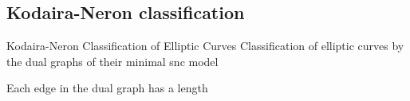 \subsection{Kodaira-Neron classification} \label{sec:kodaira-neron_classification}

\begin{frame}{Kodaira-Neron Classification of Elliptic Curves}
	Classification of elliptic curves by the dual graphs of their minimal snc model
		\pause
	\begin{figure}[ht]
    \centering
\end{figure}
\end{frame}

\begin{frame}
	Each edge in the dual graph has a length
\begin{figure}[ht]
    \centering
\end{figure}
\end{frame}





